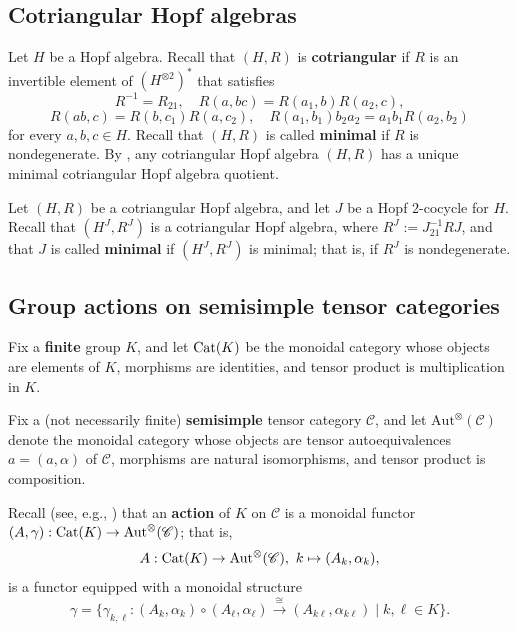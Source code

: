 \documentclass{amsart}
\theoremstyle{definition}
\newcommand{\C}{\mathscr{C}}
\newcommand{\ot}{\otimes}
\numberwithin{equation}{section}
\begin{document}
\subsection{Cotriangular Hopf algebras}\label{sec:cothopalg} 
Let $H$ be a Hopf algebra. Recall that $(H,R)$ is {\bf cotriangular} if $R$ is an invertible element of $(H^{\ot 2})^*$ that satisfies 
\begin{equation*}
R^{-1}=R_{21},\quad R(a,bc)=R(a_1,b)R(a_2,c),
\end{equation*}
\begin{equation*}
R(ab,c)=R(b,c_1)R(a,c_2),\quad R(a_1,b_1)b_2a_2=a_1b_1R(a_2,b_2)
\end{equation*}
for every $a,b,c\in H$.
Recall that $(H,R)$ is called {\bf minimal} if $R$ is nondegenerate. By \cite[Proposition 2.1]{G}, any cotriangular Hopf algebra $(H,R)$ has a unique minimal cotriangular Hopf algebra quotient.

Let $(H,R)$ be a cotriangular Hopf algebra, and let $J$ be a Hopf $2$-cocycle for $H$. Recall that $(H^J,R^J)$ is a cotriangular Hopf algebra, where $R^J:=J_{21}^{-1}RJ$, and that $J$ is called {\bf minimal} if $(H^J,R^J)$ is minimal; that is, if $R^J$ is nondegenerate.

\subsection{Group actions on semisimple tensor categories}\label{sec:Group actions on tensor categories}
Fix a {\bf finite} group $K$, and let ${\rm Cat}(K)$ be the
monoidal category whose objects are elements of $K$, morphisms are
identities, and tensor product is multiplication in
$K$. 

Fix a (not necessarily finite) {\bf semisimple} tensor category $\C$, and let $\text{Aut}^\ot(\C)$ denote the
monoidal category whose objects are tensor autoequivalences $a=(a,\alpha)$ of $\C$, morphisms are
natural isomorphisms, and tensor product is composition.
 
Recall (see, e.g., \cite[Definition 2.7.1]{EGNO}) that an {\bf action} of $K$ on $\C$ is a monoidal functor $(A,\gamma):{\rm Cat}(K) \to \text{Aut}^\ot(\C)$; that is,  
\begin{equation}\label{actiofunctor}
A:{\rm Cat}(K)\to \text{Aut}^\ot(\C),\,\,k \mapsto
(A_k,\alpha_k),
\end{equation}
is a functor equipped with a monoidal structure 
\begin{equation}\label{gammamonstr}
\gamma=\{\gamma_{k,\ell}: (A_k,\alpha_k)\circ (A_{\ell},\alpha_{\ell})\xrightarrow{\cong} (A_{k\ell},\alpha_{k\ell})\mid k,\ell\in K\}.
\end{equation}
\end{document}
